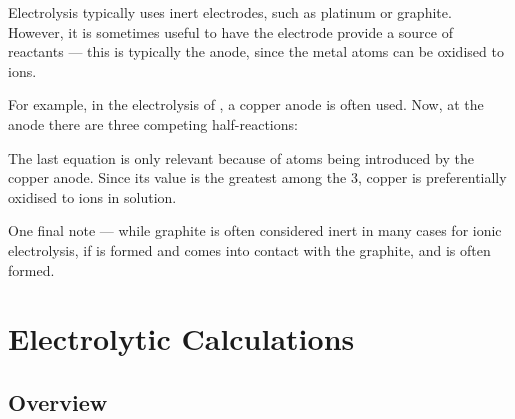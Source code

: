 				Electrolysis typically uses inert electrodes, such as platinum or graphite. However, it is sometimes useful to have the
				electrode provide a source of reactants --- this is typically the anode, since the metal atoms can be oxidised to ions.

				For example, in the electrolysis of , a copper anode is often used. Now, at the anode there are three
				competing half-reactions:



				The last equation is only relevant because of  atoms being introduced by the copper anode. Since its \Eox{} value is the
				greatest among the 3, copper is preferentially oxidised to  ions in solution.

				One final note --- while graphite is often considered inert in many cases for ionic electrolysis, if  is formed and
				comes into contact with the graphite,  and  is often formed.








	\section{Electrolytic Calculations}

		\subsection{Overview}


